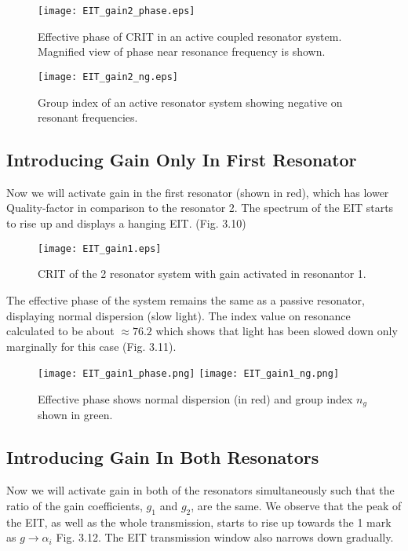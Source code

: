 \begin{figure}[h]
\centering
\texttt{[image: EIT\_gain2\_phase.eps]}
\caption{Effective phase of CRIT in an active coupled resonator system. Magnified view of phase near resonance frequency is shown.}
\end{figure}

     
\begin{figure}[h]
\centering
\texttt{[image: EIT\_gain2\_ng.eps]}
\caption{Group index of an active resonator system showing negative on resonant frequencies.}
\end{figure}


\subsection{Introducing Gain Only In First Resonator}
Now we will activate gain in the first resonator (shown in red), which has lower Quality-factor in comparison to the resonator 2. The spectrum of the EIT starts to rise up and displays a hanging EIT. (Fig. 3.10)

\begin{figure}[h]
\centering
\texttt{[image: EIT\_gain1.eps]}
\caption{CRIT of the 2 resonator system with gain activated in resonantor 1.}
\end{figure}

The effective phase of the system remains the same as a passive resonator, displaying normal dispersion (slow light). The index value on resonance calculated to be about $\approx 76.2$ which shows that light has been slowed down only marginally for this case (Fig. 3.11). 

\begin{figure}[h]
\texttt{[image: EIT\_gain1\_phase.png]}
\texttt{[image: EIT\_gain1\_ng.png]}
\caption{Effective phase shows normal dispersion (in red) and group index $n_{g}$ shown in green.}
\end{figure}


\subsection{Introducing Gain In Both Resonators}
Now we will activate gain in both of the resonators simultaneously such that the ratio of the gain coefficients, $g_{1}$ and $g_{2}$, are the same. We observe that the peak of the EIT, as well as the whole transmission, starts to rise up towards the 1 mark as $g \to \alpha_{i}$ Fig. 3.12. The EIT transmission window also narrows down gradually.

